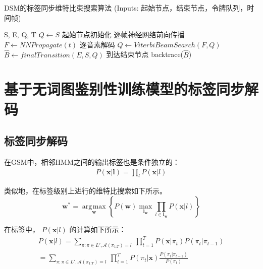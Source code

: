 \begin{algorithm}[ht]
\caption{DSM的标签同步维特比束搜索算法 \textcolor[rgb]{0,0.5,0}{(Inputs: 起始节点，结束节点，令牌队列，时间帧)}}
\label{code:lsd-dsm-alg}
\begin{algorithmic}[1]
 {S, E, Q, T}
\State $Q \leftarrow S$ \Comment \textcolor[rgb]{0,0.5,0}{起始节点初始化}
    \Comment \textcolor[rgb]{0,0.5,0}{逐帧神经网络前向传播}
\State $F \leftarrow NNPropagate(t)$
   \Comment \textcolor[rgb]{0,0.5,0}{逐音素解码}
\State  $Q\leftarrow ViterbiBeamSearch(F, Q)$
\EndIf
\EndFor
\State $\hat B\leftarrow finalTransition(E,S,Q)$ \Comment \textcolor[rgb]{0,0.5,0}{到达结束节点}
\State backtrace($\hat B$)
\EndProcedure
\end{algorithmic}
\end{algorithm}


\section{基于无词图鉴别性训练模型的标签同步解码}
\label{chap:lsd-lfmmi}

\subsection{标签同步解码}
\label{chap:lsd-lsd-hmm}

在GSM中，相邻HMM之间的输出标签也是条件独立的：
\begin{equation} \label{eq:viterbi-blk-hmm}
  \begin{split}
        P(\mathbf{x}|\mathbf{l}) 
        = \prod_{l} P(\mathbf{x}|l) \end{split}
       \end{equation}

类似地，在标签级别上进行的维特比搜索如下所示。
\begin{equation} \label{eq:gsm-dec-lsd}
   \mathbf{w}^* = \mathop{\arg\!\max}\limits_\mathbf{w} \left\{
        P(\mathbf{w})
        \mathop{\max}\limits_{\mathbf{l}_\mathbf{w}}  \prod_{l\in\mathbf{l}_\mathbf{w}} P(\mathbf{x}|l)\right\}
     \end{equation}

在标签中， $P(\mathbf{x}|l)$ 的计算如下所示：
\begin{equation} \label{eq:viterbi-blk-gsm}
  \begin{split}
        P(\mathbf{x}|l)
        = \sum_{\pi:\pi \in L',\mathcal{A}(\pi_{1\mathord{:}T})=l}
          \ \prod_{t=1}^{T} P(\mathbf{x}|\pi_t)P(\pi_t|\pi_{t-1})\\
= \sum_{\pi:\pi \in L',\mathcal{A}(\pi_{1\mathord{:}T})=l}
          \ \prod_{t=1}^{T} P(\pi_t|\mathbf{x})\frac{P(\pi_t|\pi_{t-1})}{P(\pi_t)}
        \end{split}
       \end{equation}  


